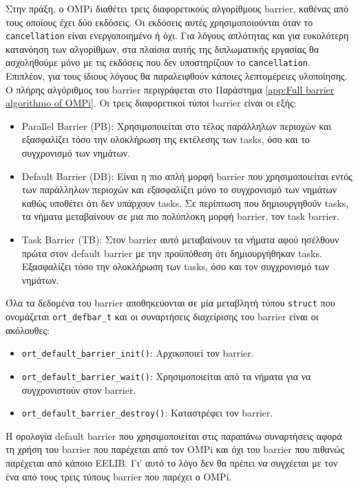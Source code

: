 Στην πράξη, ο OMPi διαθέτει τρεις διαφορετικούς αλγορίθμους barrier, καθένας από τους οποίους έχει δύο εκδόσεις. Οι εκδόσεις αυτές χρησιμοποιούνται όταν το \texttt{cancellation} είναι ενεργοποιημένο ή όχι. Για λόγους απλότητας και για ευκολότερη κατανόηση των αλγορίθμων, στα πλαίσια αυτής της διπλωματικής εργασίας θα ασχοληθούμε μόνο με τις εκδόσεις που δεν υποστηρίζουν το \texttt{cancellation}. Επιπλέον,  για τους ίδιους λόγους θα παραλειφθούν κάποιες λεπτομέρειες υλοποίησης. Ο πλήρης αλγόριθμος του barrier περιγράφεται στο Παράστημα \ref{app:Full barrier algorithmo of OMPi}. Οι τρεις διαφορετικοί τύποι barrier είναι οι εξής:
\begin{itemize}
	\item Parallel Barrier (PB): Χρησιμοποιείται στο τέλος παράλληλων περιοχών και εξασφαλίζει τόσο την ολοκλήρωση της εκτέλεσης των tasks, όσο και το συγχρονισμό των νημάτων.
	\item Default Barrier (DB): Είναι η πιο απλή μορφή barrier που χρησιμοποιείται εντός των παράλληλων περιοχών και εξασφαλίζει μόνο το συγχρονισμό των νημάτων καθώς υποθέτει ότι δεν υπάρχουν tasks. Σε περίπτωση που δημιουργηθούν tasks, τα νήματα μεταβαίνουν σε μια πιο πολύπλοκη μορφή barrier, τον task barrier. 
	\item Task Barrier (TB): Στον barrier αυτό μεταβαίνουν τα νήματα αφού ησέλθουν πρώτα στον default barrier με την προϋπόθεση ότι δημιουργήθηκαν tasks. Εξασφαλίζει τόσο την ολοκλήρωση των tasks, όσο και τον συγχρονισμό των νημάτων.
\end{itemize}

Όλα τα δεδομένα του barrier αποθηκεύονται σε μία μεταβλητή τύπου \texttt{struct} που ονομάζεται \texttt{ort\_defbar\_t} και οι συναρτήσεις διαχείρισης του barrier είναι οι ακόλουθες:

\begin{itemize}
	\item \texttt{ort\_default\_barrier\_init()}: Αρχικοποιεί τον barrier.
	\item \texttt{ort\_default\_barrier\_wait()}: Χρησιμοποιείται από τα νήματα για να συγχρονιστούν στον barrier.
	\item \texttt{ort\_default\_barrier\_destroy()}: Καταστρέφει τον barrier.
\end{itemize}

Η ορολογία default barrier που χρησιμοποιείται στις παραπάνω συναρτήσεις αφορά τη χρήση του barrier που παρέχεται από τον OMPi και όχι του barrier που πιθανώς παρέχεται από κάποιο EELIB. Γι' αυτό το λόγο δεν θα πρέπει να συγχέεται με τον ένα από τους τρεις τύπους barrier που παρέχει ο OMPi.

